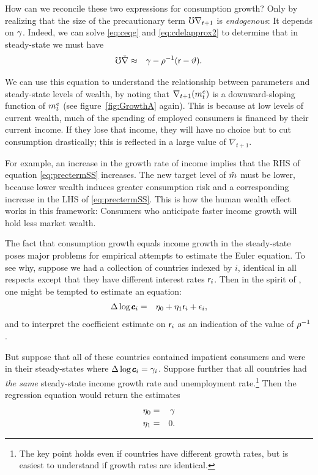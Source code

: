 \message{ !name(TractableBufferStock.tex)}\documentclass{handout}
\begin{document}
How can we reconcile these two expressions for consumption growth?
Only by realizing that the size of the precautionary term $\mho
\nabla_{t+1}$ is {\it endogenous}: It depends on $\gamma$.  Indeed, we
can solve \eqref{eq:ceqg} and \eqref{eq:cdelapprox2} to determine that
in steady-state we must have 
\begin{eqnarray}
        \mho \check{\nabla} & \approx & \gamma - \rho^{-1}(\mathsf{r}-\vartheta). \label{eq:prectermSS}
\end{eqnarray}

We can use this equation to understand the relationship between
parameters and steady-state levels of wealth, by noting that
$\nabla_{t+1}(m^{e}_{t})$ is a downward-sloping function of
$m^{e}_{t}$ (see figure~\ref{fig:GrowthA} again).  This is because at
low levels of current wealth, much of the spending of employed
consumers is financed by their current income.  If they lose that
income, they will have no choice but to cut consumption drastically; this is
reflected in a large value of $\nabla_{t+1}$.

For example, an increase in the growth rate of income implies that the
RHS of equation \eqref{eq:prectermSS} increases.  The new target level of
$\mTarg^{\null}$ must be lower, because lower wealth induces greater consumption risk and a corresponding increase in the LHS of \eqref{eq:prectermSS}.  This is how the human wealth effect works in this framework:
Consumers who anticipate faster income growth will hold less market wealth.

The fact that consumption growth equals income growth in the
steady-state poses major problems for empirical attempts to estimate
the Euler equation.  To see why, suppose we had a collection of
countries indexed by $i$, identical in all respects except that
they have different interest rates $\mathsf{r}_{i}$.
Then in the spirit of \cite{hallSubstitution}, one might be
tempted to estimate an equation:
\begin{eqnarray}
        \Delta \log \pmb{c}_{i} & = & \eta_{0} + \eta_{1} \mathsf{r}_{i}+\epsilon_{i},
\end{eqnarray}
and to interpret the coefficient estimate on $\mathsf{r}_{i}$ as an indication
of the value of $\rho^{-1}$.

But suppose that all of these countries contained impatient consumers
and were in their steady-states where $\Delta \log \pmb{c}_{i} = \gamma_{i}$.
Suppose further
that all countries had {\it the same} steady-state income growth rate and
unemployment rate.\footnote{The key point holds even if countries have different
growth rates, but is easiest to understand if growth rates are identical.}
Then the regression equation would return the estimates
\begin{eqnarray}
        \eta_{0} & = & \gamma  \\
        \eta_{1} & = & 0.
\end{eqnarray}
\end{document}
